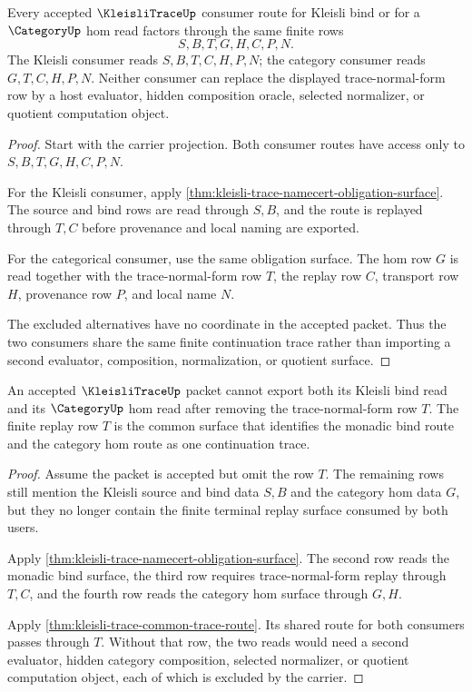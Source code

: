 \begin{theorem}
\label{thm:kleisli-trace-common-trace-route}
Every accepted $\KleisliTraceUp$ consumer route for Kleisli bind or for a $\CategoryUp$ hom read factors through the same finite rows
$$
S,B,T,G,H,C,P,N.
$$
The Kleisli consumer reads $S,B,T,C,H,P,N$; the category consumer reads $G,T,C,H,P,N$. Neither consumer can replace the displayed trace-normal-form row by a host evaluator, hidden composition oracle, selected normalizer, or quotient computation object.
\end{theorem}
\begin{proof}
Start with the carrier projection. Both consumer routes have access only to $S,B,T,G,H,C,P,N$.

For the Kleisli consumer, apply \autoref{thm:kleisli-trace-namecert-obligation-surface}. The source and bind rows are read through $S,B$, and the route is replayed through $T,C$ before provenance and local naming are exported.

For the categorical consumer, use the same obligation surface. The hom row $G$ is read together with the trace-normal-form row $T$, the replay row $C$, transport row $H$, provenance row $P$, and local name $N$.

The excluded alternatives have no coordinate in the accepted packet. Thus the two consumers share the same finite continuation trace rather than importing a second evaluator, composition, normalization, or quotient surface.
\end{proof}

\begin{theorem}
\label{thm:kleisli-trace-normal-form-necessity}
An accepted $\KleisliTraceUp$ packet cannot export both its Kleisli bind read and its $\CategoryUp$ hom read after removing the trace-normal-form row $T$. The finite replay row $T$ is the common surface that identifies the monadic bind route and the category hom route as one continuation trace.
\end{theorem}
\begin{proof}
Assume the packet is accepted but omit the row $T$. The remaining rows still mention the Kleisli source and bind data $S,B$ and the category hom data $G$, but they no longer contain the finite terminal replay surface consumed by both users.

Apply \autoref{thm:kleisli-trace-namecert-obligation-surface}. The second row reads the monadic bind surface, the third row requires trace-normal-form replay through $T,C$, and the fourth row reads the category hom surface through $G,H$.

Apply \autoref{thm:kleisli-trace-common-trace-route}. Its shared route for both consumers passes through $T$. Without that row, the two reads would need a second evaluator, hidden category composition, selected normalizer, or quotient computation object, each of which is excluded by the carrier.
\end{proof}

